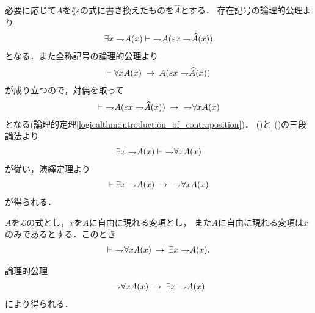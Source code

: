 	\begin{sketch}
		必要に応じて$A$を$\lang{\varepsilon}$の式に書き換えたものを$\widehat{A}$とする．
		存在記号の論理的公理より
		\begin{align}
			\exists x \rightharpoondown\hspace{-0.25em} A(x) \vdash\ \rightharpoondown\hspace{-0.25em} A(\varepsilon x \rightharpoondown\hspace{-0.25em} \widehat{A}(x))
			\label{fom:weak_De_Morgan_law_for_quantifiers_1_1}
		\end{align}
		となる．また全称記号の論理的公理より
		\begin{align}
			\vdash \forall x A(x) \hspace{0.25em}\rightarrow\hspace{0.25em} A(\varepsilon x \rightharpoondown\hspace{-0.25em} \widehat{A}(x))
		\end{align}
		が成り立つので，対偶を取って
		\begin{align}
			\vdash\ \rightharpoondown\hspace{-0.25em} A(\varepsilon x \rightharpoondown\hspace{-0.25em} \widehat{A}(x)) \hspace{0.25em}\rightarrow\hspace{0.25em}\ \rightharpoondown\hspace{-0.25em} \forall x A(x)
			\label{fom:weak_De_Morgan_law_for_quantifiers_1_2}
		\end{align}
		となる(論理的定理\ref{logicalthm:introduction_of_contraposition})．
		()と
		()の三段論法より
		\begin{align}
			\exists x \rightharpoondown\hspace{-0.25em} A(x) \vdash\ \rightharpoondown\hspace{-0.25em} \forall x A(x)
		\end{align}
		が従い，演繹定理より
		\begin{align}
			\vdash \exists x \rightharpoondown\hspace{-0.25em} A(x) \hspace{0.25em}\rightarrow\hspace{0.25em}\ \rightharpoondown\hspace{-0.25em} \forall x A(x)
		\end{align}
		が得られる．
		\QED
	\end{sketch}
	
	\begin{screen}
		\begin{logicalthm}
		\label{logicalthm:weak_De_Morgan_law_for_quantifiers_2}
			$A$を$\mathcal{L}$の式とし，$x$を$A$に自由に現れる変項とし，
			また$A$に自由に現れる変項は$x$のみであるとする．このとき
			\begin{align}
				\vdash\ \rightharpoondown\hspace{-0.25em} \forall x A(x) \hspace{0.25em}\rightarrow\hspace{0.25em} \exists x \rightharpoondown\hspace{-0.25em} A(x).
			\end{align}
		\end{logicalthm}
	\end{screen}
	
	\begin{sketch}
		論理的公理
		\begin{align}
			\rightharpoondown\hspace{-0.25em} \forall x A(x) \hspace{0.25em}\rightarrow\hspace{0.25em} \exists x \rightharpoondown\hspace{-0.25em} A(x)
		\end{align}
		により得られる．
		\QED
	\end{sketch}
	
